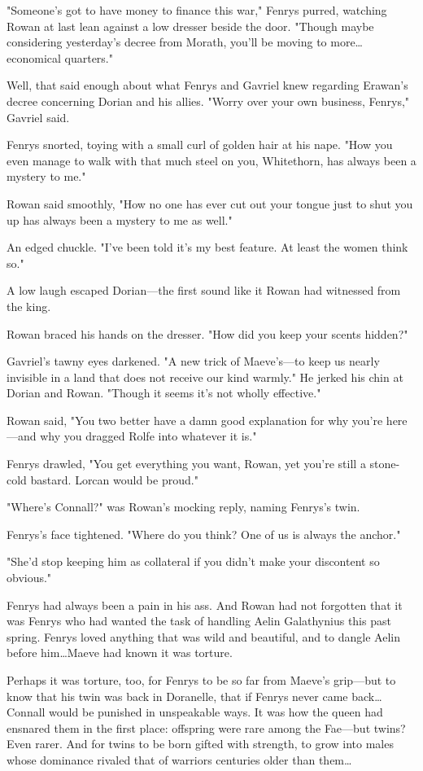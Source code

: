 "Someone's got to have money to finance this war," Fenrys purred, watching Rowan at last lean against a low dresser beside the door.
"Though maybe considering yesterday's decree from Morath, you'll be moving to more\ldots economical quarters."

Well, that said enough about what Fenrys and Gavriel knew regarding Erawan's decree concerning Dorian and his allies.
"Worry over your own business, Fenrys," Gavriel said.

Fenrys snorted, toying with a small curl of golden hair at his nape.
"How you even manage to walk with that much steel on you, Whitethorn, has always been a mystery to me."

Rowan said smoothly, "How no one has ever cut out your tongue just to shut you up has always been a mystery to me as well."

An edged chuckle.
"I've been told it's my best feature.
At least the women think so."

A low laugh escaped Dorian---the first sound like it Rowan had witnessed from the king.

Rowan braced his hands on the dresser.
"How did you keep your scents hidden?"

Gavriel's tawny eyes darkened.
"A new trick of Maeve's---to keep us nearly invisible in a land that does not receive our kind warmly."
He jerked his chin at Dorian and Rowan.
"Though it seems it's not wholly effective."

Rowan said, "You two better have a damn good explanation for why you're here---and why you dragged Rolfe into whatever it is."

Fenrys drawled, "You get everything you want, Rowan, yet you're still a stone-cold bastard.
Lorcan would be proud."

"Where's Connall?"
was Rowan's mocking reply, naming Fenrys's twin.

Fenrys's face tightened.
"Where do you think?
One of us is always the anchor."

"She'd stop keeping him as collateral if you didn't make your discontent so obvious."

Fenrys had always been a pain in his ass.
And Rowan had not forgotten that it was Fenrys who had wanted the task of handling Aelin Galathynius this past spring.
Fenrys loved anything that was wild and beautiful, and to dangle Aelin before him\ldots Maeve had known it was torture.

Perhaps it was torture, too, for Fenrys to be so far from Maeve's grip---but to know that his twin was back in Doranelle, that if Fenrys never came back\ldots Connall would be punished in unspeakable ways.
It was how the queen had ensnared them in the first place: offspring were rare among the Fae---but twins?
Even rarer.
And for twins to be born gifted with strength, to grow into males whose dominance rivaled that of warriors centuries older than them\ldots{}

